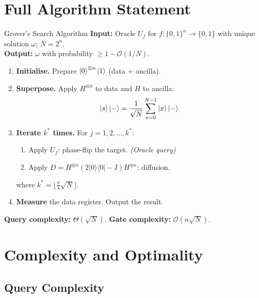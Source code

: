 \documentclass[12pt,a4paper]{article}
\newcommand{\proj}[1]{\vert#1\rangle\langle#1\vert}
\newcommand{\Order}[1]{\mathcal{O}\!\left(#1\right)}
\begin{document}
\section{Full Algorithm Statement}
\label{sec:alg}

\begin{algobox}{Grover's Search Algorithm}
\textbf{Input:} Oracle $U_f$ for $f:\{0,1\}^n\to\{0,1\}$ with unique solution $\omega$; $N=2^n$.\\
\textbf{Output:} $\omega$ with probability $\geq 1-\Order{1/N}$.

\medskip
\begin{enumerate}[leftmargin=2em,label=\textbf{Step \arabic*.}]
  \item \textbf{Initialise.} Prepare $\ket{0}^{\otimes n}\ket{1}$ (data + ancilla).
  \item \textbf{Superpose.} Apply $H^{\otimes n}$ to data and $H$ to ancilla:
        \[
          \ket{s}\ket{-} = \frac{1}{\sqrt{N}}\sum_{x=0}^{N-1}\ket{x}\ket{-}
        \]
  \item \textbf{Iterate $k^*$ times.} For $j = 1, 2, \ldots, k^*$:
        \begin{enumerate}[label=(\alph*)]
          \item Apply $U_f$: phase-flip the target. \hfill \emph{(Oracle query)}
          \item Apply $D = H^{\otimes n}(2\proj{0}-I)H^{\otimes n}$: diffusion.
        \end{enumerate}
        where $k^* = \bigl\lfloor\tfrac{\pi}{4}\sqrt{N}\bigr\rfloor$.
  \item \textbf{Measure} the data register. Output the result.
\end{enumerate}

\medskip
\textbf{Query complexity:} $\Theta(\sqrt{N})$. \quad \textbf{Gate complexity:} $\Order{n\sqrt{N}}$.
\end{algobox}

\section{Complexity and Optimality}
\label{sec:complexity}

\subsection{Query Complexity}
\end{document}
